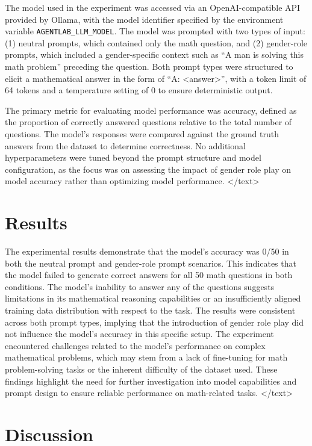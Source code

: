 \documentclass{article}
\begin{document}
The model used in the experiment was accessed via an OpenAI-compatible API provided by Ollama, with the model identifier specified by the environment variable \texttt{AGENTLAB\_LLM\_MODEL}. The model was prompted with two types of input: (1) neutral prompts, which contained only the math question, and (2) gender-role prompts, which included a gender-specific context such as ``A man is solving this math problem'' preceding the question. Both prompt types were structured to elicit a mathematical answer in the form of ``A: <answer>'', with a token limit of 64 tokens and a temperature setting of 0 to ensure deterministic output.

The primary metric for evaluating model performance was accuracy, defined as the proportion of correctly answered questions relative to the total number of questions. The model's responses were compared against the ground truth answers from the dataset to determine correctness. No additional hyperparameters were tuned beyond the prompt structure and model configuration, as the focus was on assessing the impact of gender role play on model accuracy rather than optimizing model performance.
</text>
\section{Results}
The experimental results demonstrate that the model's accuracy was 0/50 in both the neutral prompt and gender-role prompt scenarios. This indicates that the model failed to generate correct answers for all 50 math questions in both conditions. The model's inability to answer any of the questions suggests limitations in its mathematical reasoning capabilities or an insufficiently aligned training data distribution with respect to the task. The results were consistent across both prompt types, implying that the introduction of gender role play did not influence the model's accuracy in this specific setup. The experiment encountered challenges related to the model's performance on complex mathematical problems, which may stem from a lack of fine-tuning for math problem-solving tasks or the inherent difficulty of the dataset used. These findings highlight the need for further investigation into model capabilities and prompt design to ensure reliable performance on math-related tasks.
</text>
\section{Discussion}
\end{document}
